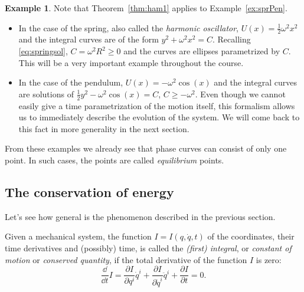 \documentclass[english,fontsize=11pt,paper=b5]{scrbook}
\theoremstyle{definition}
\newtheorem{example}{Example}[chapter]
\begin{document}
    \begin{example}
      Note that Theorem~\ref{thm:ham1} applies to Example~\ref{ex:sprPen}.
      \begin{itemize}
        \item In the case of the spring, also called the \emph{harmonic oscillator}, $U(x) = \frac12 \omega^2 x^2$ and the integral curves are of the form $y^2 + \omega^2 x^2 = C$.
          Recalling \eqref{eq:springsol}, $C = \omega^2 R^2 \geq 0$ and the curves are ellipses parametrized by $C$.
          This will be a very important example throughout the course.
        \item In the case of the pendulum, $U(x) = -\omega^2 \cos(x)$ and the integral curves are solutions of $\frac12 y^2 - \omega^2 \cos(x) = C$, $C \geq -\omega^2$.
          Even though we cannot easily give a time parametrization of the motion itself, this formalism allows us to immediately describe the evolution of the system.
          We will come back to this fact in more generality in the next section.
      \end{itemize}
    \end{example}


    From these examples we already see that phase curves can consist of only one point. In such cases, the points are called \emph{equilibrium} points.

    \subsection{The conservation of energy}\label{sec:energy}

    Let's see how general is the phenomenon described in the previous section.

    \begin{tcolorbox}
      Given a mechanical system, the function $I = I(q, \dot q, t)$ of the coordinates, their time derivatives and (possibly) time, is called the \emph{(first) integral}, or \emph{constant of motion} or \emph{conserved quantity}, if the total derivative of the function $I$ is zero:
      \begin{equation}\label{eq:firstintegralD}
        \frac{\dd}{\dd t}I =
        \frac{\partial I}{\partial q^i} \dot q^i +
        \frac{\partial I}{\partial \dot q^i} \ddot q^i +
        \frac{\partial I}{\partial t}
        = 0.
      \end{equation}
    \end{tcolorbox}
\end{document}
